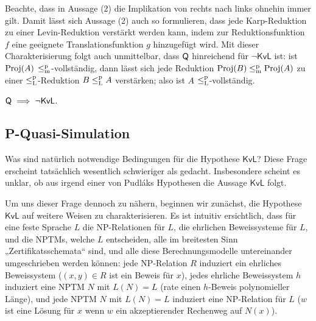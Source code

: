 Beachte, dass in Aussage (2) die Implikation von rechts nach links ohnehin immer gilt. 
Damit lässt sich Aussage (2) auch so formulieren, dass jede Karp-Reduktion zu einer Levin-Reduktion verstärkt werden kann, indem zur Reduktionsfunktion $f$ eine geeignete Translationsfunktion $g$ hinzugefügt wird.
Mit dieser Charakterisierung folgt auch unmittelbar, dass $\mathsf{Q}$ hinreichend für $\neg\mathsf{KvL}$ ist: ist $\operatorname{Proj}(A)$ $\leq_\mathrm{m}^\mathrm{p}$-vollständig, dann lässt sich jede Reduktion $\operatorname{Proj}(B)\leq_\mathrm{m}^\mathrm{p} \operatorname{Proj}(A)$ zu einer $\leq_\mathrm{L}^\mathrm{p}$-Reduktion $B\leq_\mathrm{L}^\mathrm{p} A$ verstärken; also ist $A$ $\leq_\mathrm{L}^\mathrm{p}$-vollständig.


\begin{corollary}\label{cor:kvl-implies-q}
    $\mathsf{Q}\implies \neg\mathsf{KvL}$.
\end{corollary}

\subsection*{P-Quasi-Simulation}

Was sind natürlich notwendige Bedingungen für die Hypothese $\mathsf{KvL}$? Diese Frage erscheint tatsächlich wesentlich schwieriger als gedacht. Insbesondere scheint es unklar, ob aus irgend einer von Pudláks Hypothesen die Aussage $\mathsf{KvL}$ folgt.

Um uns dieser Frage dennoch zu nähern, beginnen wir zunächst, die Hypothese $\mathsf{KvL}$ auf weitere Weisen zu charakterisieren. Es ist intuitiv ersichtlich, dass für eine feste Sprache $L$ die NP-Relationen für $L$, die ehrlichen Beweissysteme für $L$, und die NPTMs, welche $L$ entscheiden, alle im breitesten Sinn „Zertifikatsschemata“ sind, und alle diese Berechnungsmodelle untereinander umgeschrieben werden können: jede NP-Relation $R$ induziert ein ehrliches Beweissystem ($(x,y)\in R$ ist ein Beweis für $x$), jedes ehrliche Beweissystem $h$ induziert eine NPTM $N$ mit $L(N)=L$ (rate einen $h$-Beweis polynomieller Länge), und jede NPTM $N$ mit $L(N)=L$ induziert eine NP-Relation für $L$ ($w$ ist eine Lösung für $x$ wenn $w$ ein akzeptierender Rechenweg auf $N(x)$).

